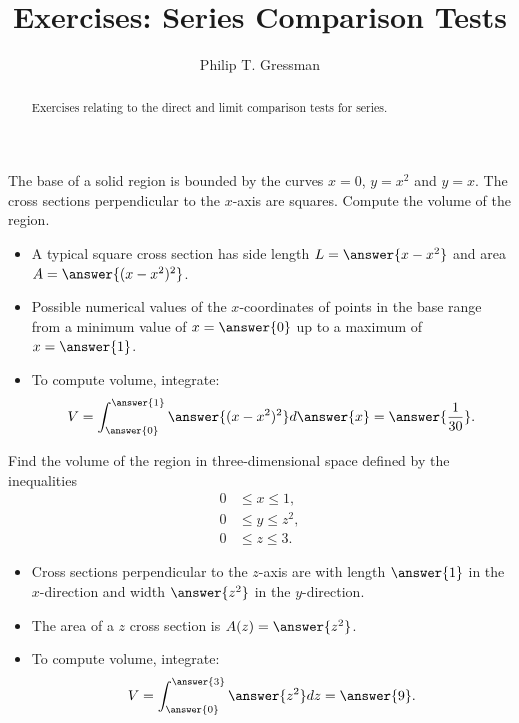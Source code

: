 \documentclass{ximera}
\title{Exercises: Series Comparison Tests}
\author{Philip T. Gressman}
\begin{document}
\begin{abstract}
Exercises relating to the direct and limit comparison tests for series.
\end{abstract}
\maketitle

\begin{exercise}
The base of a solid region is bounded by the curves $x = 0$, $y = x^2$ and $y = x$. The cross sections perpendicular to the $x$-axis are squares. Compute the volume of the region.
\begin{itemize}
\item A typical square cross section has side length $L = \answer{x - x^2}$ and area $A = \answer{(x-x^2)^2}$. 
\item Possible numerical values of the $x$-coordinates of points in the base range from a minimum value of $x = \answer{0}$ up to a maximum of $x = \answer{1}$.
\item To compute volume, integrate:
\[ V = \int_{\answer{0}}^{\answer{1}} \answer{(x-x^2)^2} d\answer{x} = \answer{\frac{1}{30}}. \]
\end{itemize}
\end{exercise}

\begin{exercise}
Find the volume of the region in three-dimensional space defined by the inequalities
\begin{align*}
0 & \leq x \leq 1, \\
0 & \leq y \leq z^2, \\
0 & \leq z \leq 3.
\end{align*}
\begin{itemize}
\item Cross sections perpendicular to the $z$-axis are  with length $\answer{1}$ in the $x$-direction and width $\answer{z^2}$ in the $y$-direction.
\item The area of a $z$ cross section is $A(z) = \answer{z^2}$.
\item To compute volume, integrate:
\[ V = \int_{\answer{0}}^{\answer{3}} \answer{z^2} dz = \answer{9}. \]
\end{itemize}
\end{exercise}
\end{document}
